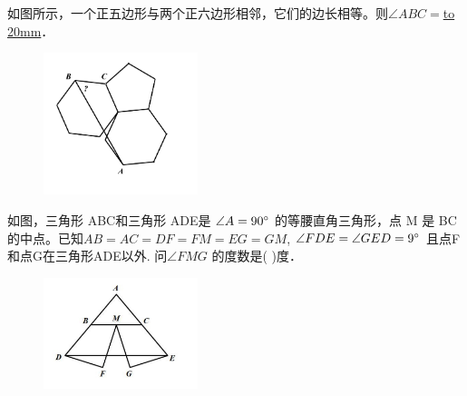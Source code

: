 \item {
    {如图所示，一个正五边形与两个正六边形相邻，它们的边长相等。则$\angle ABC = $\underline{\hbox to 20mm{}}．} 
    \begin{figure}[H] 
        \centering
        \includegraphics[width=0.4\textwidth]{./pics/Chapter_3/7.png}
    \end{figure}
    \vspace{1cm}
}
\item {
    {如图，三角形 ABC和三角形 ADE是 $\angle A=90\degree$ 的等腰直角三角形，点 M 是 BC 的中点。已知$AB=AC=DF=FM=EG=GM$, $\angle FDE = \angle GED=9\degree$ 且点F和点G在三角形ADE以外. 问$\angle FMG$ 的度数是( )度．} 
    \begin{figure}[H] 
        \centering
        \includegraphics[width=0.4\textwidth]{./pics/Chapter_3/8.png}
    \end{figure}
    \vspace{1cm}
}

